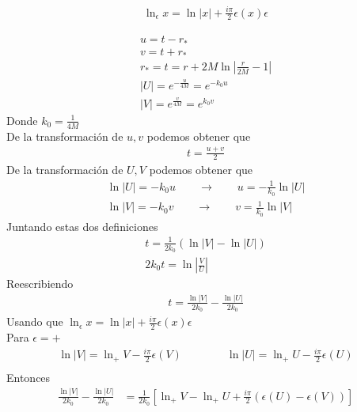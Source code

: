 \documentclass{article}
\newcommand{\caja}[3]{%
  \begin{tcolorbox}[colback=#1!5!white,colframe=#1!25!black,title=#2]
    #3
  \end{tcolorbox}%
}
\begin{document}
\caja{black}{Apéndice: Modos de frecuencia positiva}{  
\begin{gather*}
  \ln_\epsilon x = \ln \left|x \right| + \frac{i\pi }{2 } \epsilon(x) \epsilon 
\end{gather*}
}


\caja{green}{Ayuda}{
  \begin{gather*}
    u = t - r_* \\
    v = t + r_*\\
    r_* = t = r + 2M \ln \left|\frac{r }{2M } - 1 \right| \\
    \left|U \right| = e ^ {- \frac{u }{4M }} = e ^ {- k_0 u } \\
    \left|V \right| = e ^ {\frac{v }{4M }} = e ^ {k_0 v }
  \end{gather*}
  Donde $ k_0 = \frac{1}{4M } $\\
  De la transformación de $ u,v  $ podemos obtener que 
  \begin{gather*}
     t = \frac{u + v }{2 }
  \end{gather*}
  De la transformación de $ U,V  $ podemos obtener que
  \begin{gather*}
    \ln \left|U \right| = - k_0 u \qquad \rightarrow \qquad u = - \frac{1}{k_0 } \ln \left|U \right|\\ 
    \ln \left|V \right| = - k_0 v \qquad \rightarrow \qquad v = \frac{1}{k_0 } \ln \left|V \right|
  \end{gather*}
  Juntando estas dos definiciones 
  \begin{gather*}
    t = \frac{1}{2k_0 }(\ln \left|V \right| - \ln \left|U \right|) \\
    2k_0 t = \ln \left|\frac{V }{U }\right|
  \end{gather*}
  Reescribiendo 
  \begin{gather*}
    t = \frac{\ln \left|V \right|}{2k_0 } - \frac{\ln \left|U \right|}{2 k_0 } 
  \end{gather*}
  Usando que $ \ln_\epsilon x = \ln \left|x \right| + \frac{i\pi }{2 } \epsilon(x) \epsilon $\\
  Para $ \epsilon= +  $
  \begin{gather*}
    \ln \left|V \right| = \ln_+ V  - \frac{i\pi }{2 } \epsilon(V) \qquad \qquad 
    \ln \left|U \right| = \ln_+ U  - \frac{i\pi }{2 } \epsilon(U) \\
  \end{gather*}
  Entonces 
  \begin{align*}
    \frac{\ln \left|V \right|}{2k_0 } - \frac{\ln \left|U \right|}{2k_0 } &= \frac{1}{2k_0 }\left[\ln_+ V - \ln_+ U + \frac{i\pi }{2} \left(\epsilon(U) - \epsilon(V)\right)\right]\\ 

\end{align*}}
\end{document}
